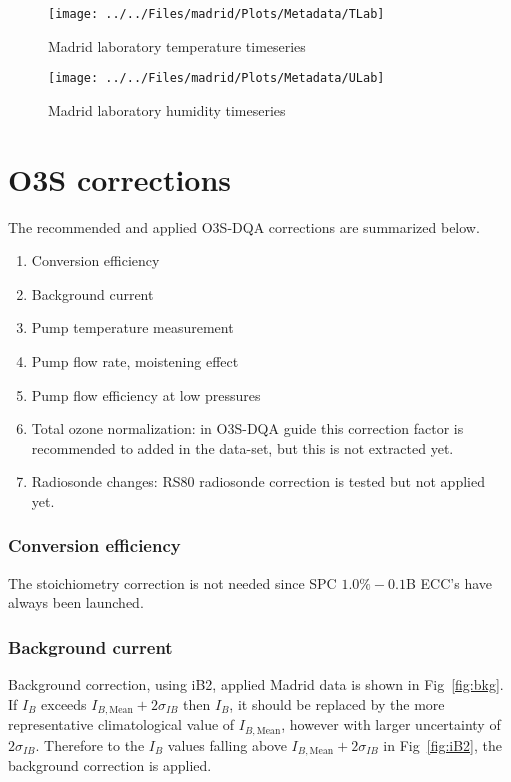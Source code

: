            \begin{figure}
        \centering
\texttt{[image: ../../Files/madrid/Plots/Metadata/TLab]}
    \caption{Madrid laboratory temperature timeseries}
            \label{fig:TLab}
    \end{figure}

               \begin{figure}
        \centering
\texttt{[image: ../../Files/madrid/Plots/Metadata/ULab]}
    \caption{Madrid laboratory humidity timeseries}
            \label{fig:ULab}
    \end{figure}


\section{O3S corrections}
\label{sec:v04}


The recommended and applied O3S-DQA corrections are summarized below.
    \begin{enumerate}
        \item Conversion efficiency
        \item Background current
        \item Pump temperature measurement
        \item Pump flow rate, moistening effect
        \item Pump flow efficiency at low pressures
        \item Total ozone normalization: in O3S-DQA guide this correction factor is recommended to added in the data-set,
        but this is not extracted yet.
        \item Radiosonde changes: RS80 radiosonde correction is tested but not applied yet.
\end{enumerate}

    \subsubsection{Conversion efficiency}
 The stoichiometry correction is not needed since SPC $1.0\%-0.1$B ECC's have always been launched.



        \subsubsection{Background current}
        Background correction, using iB2, applied Madrid data is shown in Fig~\ref{fig:bkg}. If $I_B$ exceeds $I_{B,\text{Mean}}+2\sigma_{IB}$ then $I_B$, it
should be replaced by the more representative climatological value of $I_{B,\text{Mean}}$, however with
larger uncertainty of $2\sigma_{IB}$.
Therefore to the $I_B$ values falling above $I_{B,\text{Mean}}+2\sigma_{IB}$ in Fig~\ref{fig:iB2}, the background correction is applied.


